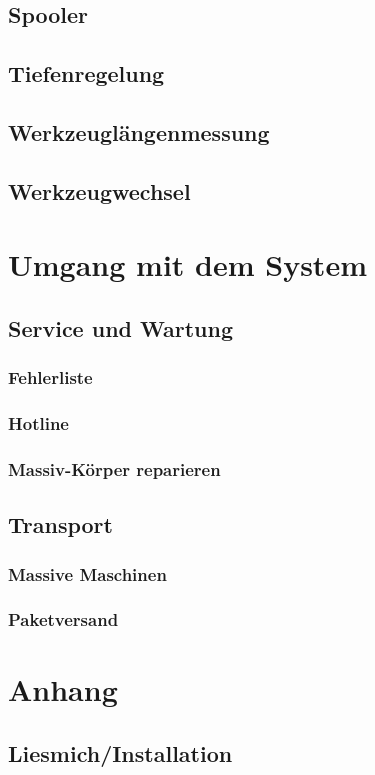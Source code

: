 \documentclass[14pt,a4paper]{book}
\begin{document}
	\section{Spooler} 
	\section{Tiefenregelung} 
	\section{Werkzeuglängenmessung} 
	\section{Werkzeugwechsel} 

\chapter{Umgang mit dem System}
	\section{Service und Wartung} 
		\subsection{Fehlerliste} 
		\subsection{Hotline} 
		\subsection{Massiv-Körper reparieren} 
	\section{Transport} 
		\subsection{Massive Maschinen} 
		\subsection{Paketversand} 
 
\chapter{Anhang}
	\section{Liesmich/Installation} 
\end{document}
